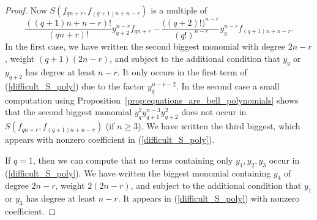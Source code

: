 \begin{proof}
Now $S(f_{qn+r} , f_{(q+1)n+n-r})$ is a multiple of
\begin{equation}\label{difficult_S_poly}
 \frac{((q+1)n+n-r)!}{(qn+r)!} y_{q+2}^{n-r}f_{qn+r} - \frac{\bigl((q+2)!\bigr)^{n-r}}{(q!)^{n-r}}y_q^{n-r}f_{(q+1)n+n-r}. 
 \end{equation}
In the first case, we have written the second biggest monomial with degree $2n-r$, weight $(q+1)(2n-r)$, and subject to the additional condition that $y_q$ or $y_{q+2}$ has degree at least $n-r$. It only occurs in the first term of (\ref{difficult_S_poly}) due to the factor $y_{q}^{n-r-2}$. In the second case a small computation using Proposition~\ref{prop:equations_are_bell_polynomials} shows that the second biggest monomial $y_q^2y_{q+1}^{n-3}y_{q+2}^2$ does not occur in $S(f_{qn+r} , f_{(q+1)n+n-r})$ (if $n\geq 3$). We have written the third biggest, which appears with nonzero coefficient in (\ref{difficult_S_poly}). 

If $q=1$, then we can compute that no terms containing only $y_1,y_2,y_3$ occur in (\ref{difficult_S_poly}). We have written the biggest monomial containing $y_4$ of degree $2n-r$, weight $2(2n-r)$, and subject to the additional condition that $y_1$ or $y_3$ has degree at least $n-r$. It appears in (\ref{difficult_S_poly}) with nonzero coefficient.
\end{proof}

